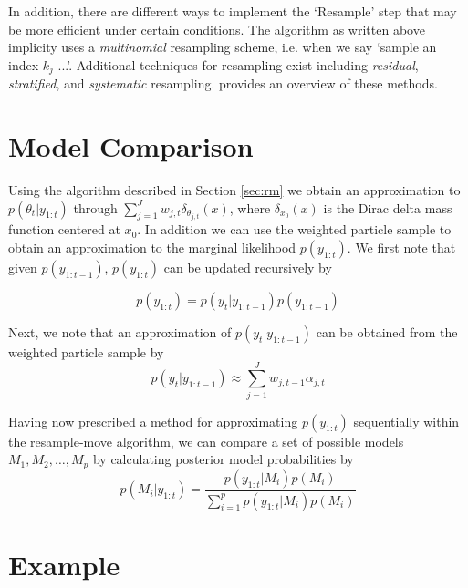 \documentclass{article}
\begin{document}
In addition, there are different ways to implement the `Resample' step that may be more efficient under certain conditions. The algorithm as written above implicity uses a \emph{multinomial} resampling scheme, i.e. when we say `sample an index $k_j$ ...'. Additional techniques for resampling exist including \emph{residual}, \emph{stratified}, and \emph{systematic} resampling. \citet{Douc:Capp:Moul:comp:2005} provides an overview of these methods. %

\section{Model Comparison}

Using the algorithm described in Section \ref{sec:rm} we obtain an approximation to $p(\theta_t|y_{1:t})$ through $\sum_{j=1}^J w_{j,t}\delta_{\theta_{j,t}}(x)$, where $\delta_{x_0}(x)$ is the Dirac delta mass function centered at $x_0$. In addition we can use the weighted particle sample to obtain an approximation to the marginal likelihood $p(y_{1:t})$. We first note that given $p(y_{1:t-1})$, $p(y_{1:t})$ can be updated recursively by

\begin{equation}
p(y_{1:t}) = p(y_t|y_{1:t-1})p(y_{1:t-1}) \label{eqn:marglik}
\end{equation}

\noindent Next, we note that an approximation of $p(y_t|y_{1:t-1})$ can be obtained from the weighted particle sample by
\begin{equation}
p(y_t|y_{1:t-1}) \approx \sum_{j=1}^J w_{j,t-1}\alpha_{j,t} \label{eqn:condmarg}
\end{equation}

Having now prescribed a method for approximating $p(y_{1:t})$ sequentially within the resample-move algorithm, we can compare a set of possible models ${M_1,M_2,\ldots,M_p}$ by calculating posterior model probabilities by
\begin{equation}
p(M_i|y_{1:t}) = \frac{p(y_{1:t}|M_i)p(M_i)}{\sum_{i=1}^p p(y_{1:t}|M_i)p(M_i)} \label{eqn:modelcomp}
\end{equation}

\section{Example}
\end{document}
